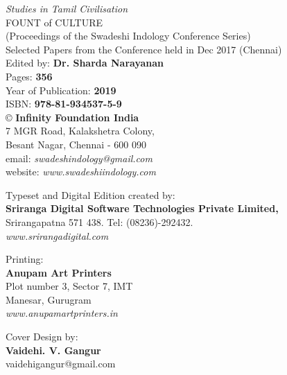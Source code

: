 \thispagestyle{empty}

 \textit{Studies in Tamil Civilisation}\\
 FOUNT of CULTURE\\ 
 (Proceedings of the Swadeshi Indology Conference Series)\\
 Selected Papers from the Conference held in Dec 2017 (Chennai)\\
 Edited by: \textbf{Dr. Sharda Narayanan}\\

 Pages: \textbf{356}\\
 Year of Publication: \textbf{2019}\\
 ISBN: \textbf{978-81-934537-5-9}\\

 © \textbf{Infinity Foundation India}\\
 7 MGR Road, Kalakshetra Colony,\\
 Besant Nagar, Chennai - 600 090\\
 email: \textit{swadeshindology@gmail.com}\\
 website: \textit{www.swadeshiindology.com}

 Typeset and Digital Edition created by:\\\textbf{Sriranga Digital Software Technologies Private Limited,}\\
 Srirangapatna 571 438. Tel: (08236)-292432.\\\textit{www.srirangadigital.com}

 Printing:\\\textbf{Anupam Art Printers}\\
 Plot number 3, Sector 7, IMT\\
 Manesar, Gurugram\\\textit{www.anupamartprinters.in}

 Cover Design by:\\\textbf{Vaidehi. V. Gangur}\\
 vaidehigangur@gmail.com

